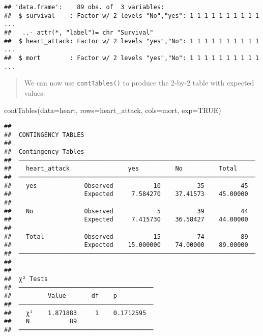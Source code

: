 \documentclass[
]{memoir}
\newenvironment{Shaded}{\begin{snugshade}}{\end{snugshade}}
\newcommand{\AttributeTok}[1]{\textcolor[rgb]{0.77,0.63,0.00}{#1}}
\newcommand{\ConstantTok}[1]{\textcolor[rgb]{0.00,0.00,0.00}{#1}}
\newcommand{\FunctionTok}[1]{\textcolor[rgb]{0.00,0.00,0.00}{#1}}
\newcommand{\NormalTok}[1]{#1}
\begin{document}
\begin{verbatim}
## 'data.frame':    89 obs. of  3 variables:
##  $ survival    : Factor w/ 2 levels "No","yes": 1 1 1 1 1 1 1 1 1 1 ...
##   ..- attr(*, "label")= chr "Survival"
##  $ heart_attack: Factor w/ 2 levels "yes","No": 1 1 1 1 1 1 1 1 1 1 ...
##  $ mort        : Factor w/ 2 levels "yes","No": 1 1 1 1 1 1 1 1 1 1 ...
\end{verbatim}

\begin{quote}
We can now use \texttt{contTables()} to produce the 2-by-2 table with expected values:
\end{quote}

\begin{Shaded}
\begin{Highlighting}[]
\FunctionTok{contTables}\NormalTok{(}\AttributeTok{data=}\NormalTok{heart, }\AttributeTok{rows=}\NormalTok{heart\_attack, }\AttributeTok{cols=}\NormalTok{mort,}
           \AttributeTok{exp=}\ConstantTok{TRUE}\NormalTok{)}
\end{Highlighting}
\end{Shaded}

\begin{verbatim}
## 
##  CONTINGENCY TABLES
## 
##  Contingency Tables                                                
##  ───────────────────────────────────────────────────────────────── 
##    heart_attack                yes          No          Total      
##  ───────────────────────────────────────────────────────────────── 
##    yes             Observed           10          35          45   
##                    Expected     7.584270    37.41573    45.00000   
##                                                                    
##    No              Observed            5          39          44   
##                    Expected     7.415730    36.58427    44.00000   
##                                                                    
##    Total           Observed           15          74          89   
##                    Expected    15.000000    74.00000    89.00000   
##  ───────────────────────────────────────────────────────────────── 
## 
## 
##  χ² Tests                              
##  ───────────────────────────────────── 
##          Value       df    p           
##  ───────────────────────────────────── 
##    χ²    1.871883     1    0.1712595   
##    N           89                      
##  ─────────────────────────────────────
\end{verbatim}
\end{document}
